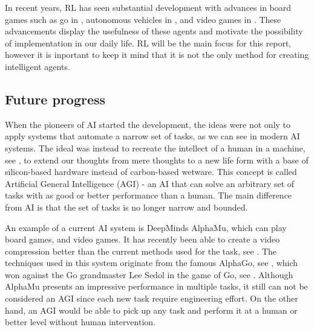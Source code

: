 \documentclass[12pt,A4]{report}
\newcommand{\autobaj}{}
\theoremstyle{definition}
\begin{document}
In recent years, RL has seen substantial development with advances in board games such as go in \citet{Silver}, autonomous vehicles in \citet{Levinson}, and video games in \citet{Minh}. These advancements display the usefulness of these agents and motivate the possibility of implementation in our daily life. RL will be the main focus for this report, however it is inportant to keep it mind that it is not the only method for creating intelligent agents. 



\subsection{Future progress}
When the pioneers of AI started the development, the ideas were not only to apply systems that automate a narrow set of tasks, as we can see in modern AI systems. The ideal was instead to recreate the intellect of a human in a machine, see \citet{Dartmouth}, to extend our thoughts from mere thoughts to a new life form with a base of silicon-based hardware instead of carbon-based wetware. This concept is called Artificial General Intelligence (AGI) - an AI that can solve an arbitrary set of tasks with as good or better performance than a human. The main difference from AI is that the set of tasks is no longer narrow and bounded. %


An example of a current AI system is DeepMinds AlphaMu, which can play board games, and video games. It has recently been able to create a video compression better than the current methods used for the task, see \citet{Mandhane}. The techniques used in this system originate from the famous AlphaGo, see \citet{Silver}, which won against the Go grandmaster Lee Sedol in the game of Go, see \citet{DeepMind}. Although AlphaMu presents an impressive performance in multiple tasks, it still can not be considered an AGI since each new task require engineering effort. On the other hand, an AGI would be able to pick up any task and perform it at a human or better level without human intervention.
\end{document}

